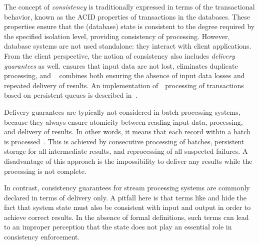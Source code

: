 \label{fs-preliminaries}

The concept of {\em consistency} is traditionally expressed in terms of the transactional behavior, known as the ACID properties of transactions in the databases. 
 These properties ensure that the (database) state is consistent to the degree required by the specified isolation level, providing consistency of processing. 
 However, database systems are not used standalone: they interact with client applications.
  From the client perspective,   the notion of consistency also includes {\em delivery guarantees} as well. {\em \Alo} ensures that input data are not lost, {\em \amo} eliminates duplicate processing, and {\em ~\eo} combines both ensuring the absence of input data losses and repeated delivery of results. An implementation of~\eo\ processing of transactions based on persistent queues is described in~\cite{DBLP:books/mk/WeikumV2002}.



Delivery guarantees are typically not considered in batch processing systems, because they always ensure atomicity between reading input data, processing, and delivery of results. In other words, it means that each record within a batch is processed~\eo. This is achieved by consecutive processing of batches, persistent storage for all intermediate results, and reprocessing of all suspected failures. 
A disadvantage of this approach is the impossibility to deliver any results while the processing is not complete.

In contrast,   consistency guarantees for stream processing systems are commonly declared in terms of delivery only. 
A pitfall here is that terms like {\em \eo} and {\em \alo} hide the fact that system state must also be consistent with input and output in order to achieve correct results. 
In the absence of formal definitions, such terms can lead to an improper perception that the state does not play an essential role in consistency enforcement. 

